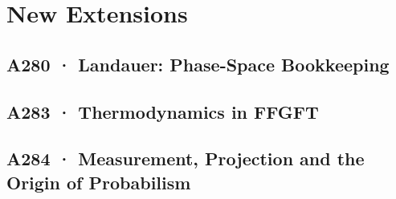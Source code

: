 \documentclass[11pt,twoside,openright]{book}
\begin{document}
\part{New Extensions}

\chapter[A280 · Phase-Space Bookkeeping (extended)]{A280 · Landauer: Phase-Space Bookkeeping}


\chapter[A283 · Thermodynamics in FFGFT]{A283 · Thermodynamics in FFGFT}


\chapter[A284 · Measurement, Projection and Probabilism]{A284 · Measurement, Projection and the Origin of Probabilism}


\end{document}
